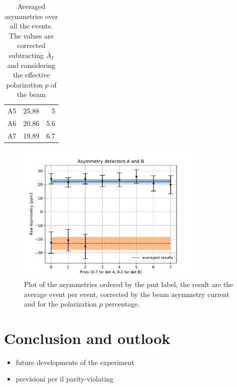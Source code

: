 \begin{table}[!ht]
{\begin{tabular}{lrr}
 A5    &     25.88 &      5   \\
 A6    &     20.86 &      5.6 \\
 A7    &     19.89 &      6.7 \\
\hline
\end{tabular}}
\qquad
{}
\caption{Averaged asymmetries over all the events. The values are corrected subtracting $\overline{A}_{I}$ and considering the effective polarization $p$ of the beam}
\end{table}

\begin{figure}[hbtp]
\centering
\includegraphics[width = 0.80\textwidth]{Analysis/Dataselection/FirstResult.pdf}
\caption{Plot of the asymmetries ordered by the pmt label, the result are the average event per event, corrected by the beam asymmetry current and for the polarization $p$ percentage.}
\end{figure}


\chapter{Conclusion and outlook} \label{conclusion}

\begin{itemize}
\item future developments of the experiment
\item previsioni per il parity-violating
\end{itemize}